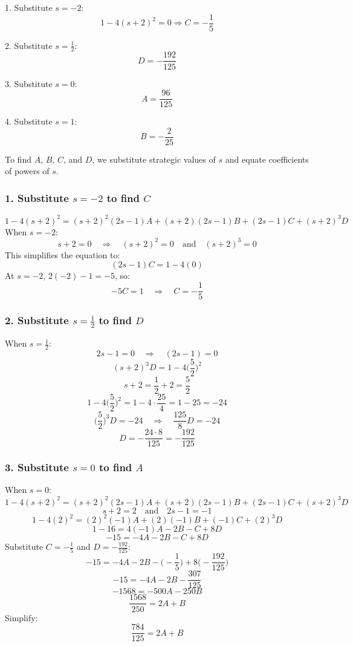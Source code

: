 \documentclass[12pt]{article}
\begin{document}
\begin{enumerate}
\begin{enumerate}
  1. Substitute \( s = -2 \):
  \[
  1 - 4 (s + 2)^2 = 0 \Rightarrow C = -\frac{1}{5}
  \]

  2. Substitute \( s = \frac{1}{2} \):
  \[
  D = -\frac{192}{125}
  \]

  3. Substitute \( s = 0 \):
  \[
  A = \frac{96}{125}
  \]

  4. Substitute \( s = 1 \):
  \[
  B = -\frac{2}{25}
  \]


  To find \( A \), \( B \), \( C \), and \( D \), we substitute strategic values of \( s \) and equate coefficients of powers of \( s \).

  \subsubsection*{1. Substitute \( s = -2 \) to find \( C \)}
  \[
  1 - 4(s + 2)^2 = (s + 2)^2 (2s - 1) A + (s + 2) (2s - 1) B + (2s - 1) C + (s + 2)^3 D
  \]
  When \( s = -2 \):
  \[
  s + 2 = 0 \quad \Rightarrow \quad (s + 2)^2 = 0 \quad \text{and} \quad (s + 2)^3 = 0
  \]
  This simplifies the equation to:
  \[
  (2s - 1) C = 1 - 4(0)
  \]
  At \( s = -2 \), \( 2(-2) - 1 = -5 \), so:
  \[
  -5 C = 1 \quad \Rightarrow \quad C = -\frac{1}{5}
  \]

  \subsubsection*{2. Substitute \( s = \frac{1}{2} \) to find \( D \)}
  When \( s = \frac{1}{2} \):
  \[
  2s - 1 = 0 \quad \Rightarrow \quad (2s - 1) = 0
  \]
  \[
  (s + 2)^3 D = 1 - 4 \bigg( \frac{5}{2} \bigg)^2
  \]
  \[
  s + 2 = \frac{1}{2} + 2 = \frac{5}{2}
  \]
  \[
  1 - 4 \bigg( \frac{5}{2} \bigg)^2 = 1 - 4 \cdot \frac{25}{4} = 1 - 25 = -24
  \]
  \[
  \bigg( \frac{5}{2} \bigg)^3 D = -24 \quad \Rightarrow \quad \frac{125}{8} D = -24
  \]
  \[
  D = -\frac{24 \cdot 8}{125} = -\frac{192}{125}
  \]

  \subsubsection*{3. Substitute \( s = 0 \) to find \( A \)}
  When \( s = 0 \):
  \[
  1 - 4 (s + 2)^2 = (s + 2)^2 (2s - 1) A + (s + 2) (2s - 1) B + (2s - 1) C + (s + 2)^3 D
  \]
  \[
  s + 2 = 2 \quad \text{and} \quad 2s - 1 = -1
  \]
  \[
  1 - 4(2)^2 = (2)^2 (-1) A + (2)(-1) B + (-1) C + (2)^3 D
  \]
  \[
  1 - 16 = 4(-1) A - 2B - C + 8D
  \]
  \[
  -15 = -4A - 2B - C + 8D
  \]
  Substitute \( C = -\frac{1}{5} \) and \( D = -\frac{192}{125} \):
  \[
  -15 = -4A - 2B - \bigg( -\frac{1}{5} \bigg) + 8 \bigg( -\frac{192}{125} \bigg)
  \]
  \[
  -15 = -4A - 2B - \frac{307}{125}
  \]
  \[
  -1568 = -500A - 250B
  \]
  \[
  \frac{1568}{250} = 2A + B
  \]
  Simplify:
  \[
  \frac{784}{125} = 2A + B
  \]


\end{enumerate}
\end{enumerate}
\end{document}
